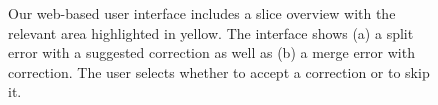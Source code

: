 \begin{figure}[ht]
 \centering
    \hfill
	\caption{Our web-based user interface includes a slice overview with the relevant area highlighted in yellow. The interface shows (a) a split error with a suggested correction as well as (b) a merge error with correction. The user selects whether to accept a correction or to skip it.}
	\vspace{-0.4cm}
\end{figure}

